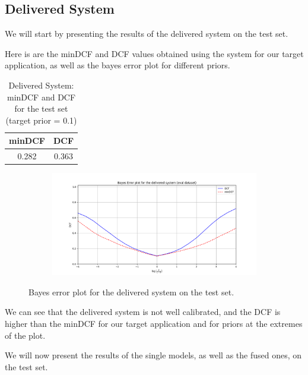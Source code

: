 \documentclass[12pt]{report}
\newcommand{\nnl}{%
    \newline
    \newline
}
\newcommand{\nl}{%
    \newline
    \noindent
}
\begin{document}
\subsection*{Delivered System}
We will start by presenting the results of the delivered system on the test set.
\nl
Here is are the minDCF and DCF values obtained using the system for our target application, as well as the bayes error plot for different priors.

\begin{table}[H]
    \centering
    \begin{tabular}{|c|c|}
        \hline
        \rowcolor{blue!10}
        \textbf{minDCF} & \textbf{DCF} \\
        \hline
        0.282           & 0.363        \\
        \hline
    \end{tabular}
    \caption{Delivered System: minDCF and DCF for the test set (target prior = 0.1)}
    \label{tab:Delivered_System}
\end{table}

\begin{figure}[H]
    \centering
    \begin{subfigure}[t]{0.6\textwidth}
        \includegraphics[width=\textwidth]{./plot/eval/delivered.png}
    \end{subfigure}
    \caption{Bayes error plot for the delivered system on the test set.}
    \label{fig:Delivered_System}
\end{figure}
\noindent
We can see that the delivered system is not well calibrated, and the DCF is higher than the minDCF for our target application and for priors at the extremes of the plot.
\nnl
We will now present the results of the single models, as well as the fused ones, on the test set.
\end{document}
